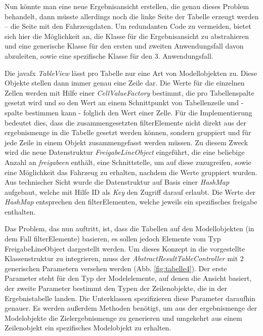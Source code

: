 Nun könnte man eine neue Ergebnisansicht erstellen, die genau dieses Problem behandelt, dann müsste allerdings noch die linke Seite der Tabelle erzeugt werden – die Seite mit den Fahrzeugdaten. Um redundanten Code zu vermeiden, bietet sich hier die Möglichkeit an, die Klasse für die Ergebnisansicht zu abstrahieren und eine generische Klasse für den ersten und zweiten Anwendungsfall davon abzuleiten, sowie eine spezifische Klasse für den 3. Anwendungsfall.

Die \gls{javafx} \textit{TableView} lässt pro Tabelle nur eine Art von Modellobjekten zu. Diese Objekte stellen dann immer genau eine Zeile dar. Die Werte für die einzelnen Zellen werden mit Hilfe einer \textit{CellValueFactory} bestimmt, die pro Tabellenspalte gesetzt wird und so den Wert an einem Schnittpunkt von Tabellenzeile und -spalte bestimmen kann - folglich den Wert einer Zelle. Für die Implementierung bedeutet dies, dass die zusammengesetzten \gls{filterElement}e nicht direkt aus der \gls{ergebnismenge} in die Tabelle gesetzt werden können, sondern gruppiert und für jede Zeile in einem Objekt zusammengefasst werden müssen. Zu diesem Zweck wird die neue Datenstruktur \textit{FreigabeLineObject} eingeführt, die eine beliebige Anzahl an \textit{\gls{freigabe}en} enthält, eine Schnittstelle, um auf diese zuzugreifen, sowie eine Möglichkeit das Fahrzeug zu erhalten, nachdem die Werte gruppiert wurden. Aus technischer Sicht wurde die Datenstruktur auf Basis einer \textit{HashMap} aufgebaut, welche mit Hilfe ID als \textit{Key} den Zugriff darauf erlaubt. Die Werte der \textit{HashMap} entsprechen den \gls{filterElement}en, welche jeweils ein spezifisches \gls{freigabe} enthalten.

Das Problem, das nun auftritt, ist, dass die Tabellen auf den Modellobjekten (in dem Fall \gls{filterElement}e) basieren, es sollen jedoch Elemente vom Typ FreigabeLineObject dargestellt werden. Um dieses Konzept in die vorgestellte Klassenstruktur zu integrieren, muss der \textit{AbstractResultTableController} mit 2 generischen Parametern versehen werden (Abb. \ref{fig:tabelle4}). Der erste Parameter steht für den Typ der Modelelemente, auf denen die Ansicht basiert, der zweite Parameter bestimmt den Typen der Zeilenobjekte, die in der Ergebnistabelle landen. Die Unterklassen spezifizieren diese Parameter daraufhin genauer. Es werden außerdem Methoden benötigt, um aus der \gls{ergebnismenge} der Modelobjekte die Zielergebnismenge zu generieren und umgekehrt aus einem Zeilenobjekt ein spezifisches Modelobjekt zu erhalten.

